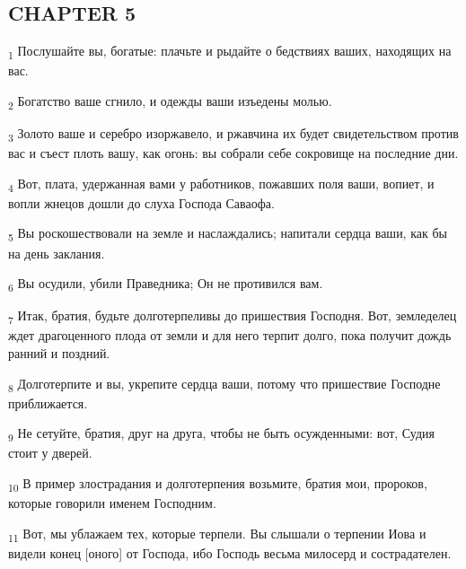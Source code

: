\subsection{CHAPTER 5}
\begin{tcolorbox}
\textsubscript{1} Послушайте вы, богатые: плачьте и рыдайте о бедствиях ваших, находящих на вас.
\end{tcolorbox}
\begin{tcolorbox}
\textsubscript{2} Богатство ваше сгнило, и одежды ваши изъедены молью.
\end{tcolorbox}
\begin{tcolorbox}
\textsubscript{3} Золото ваше и серебро изоржавело, и ржавчина их будет свидетельством против вас и съест плоть вашу, как огонь: вы собрали себе сокровище на последние дни.
\end{tcolorbox}
\begin{tcolorbox}
\textsubscript{4} Вот, плата, удержанная вами у работников, пожавших поля ваши, вопиет, и вопли жнецов дошли до слуха Господа Саваофа.
\end{tcolorbox}
\begin{tcolorbox}
\textsubscript{5} Вы роскошествовали на земле и наслаждались; напитали сердца ваши, как бы на день заклания.
\end{tcolorbox}
\begin{tcolorbox}
\textsubscript{6} Вы осудили, убили Праведника; Он не противился вам.
\end{tcolorbox}
\begin{tcolorbox}
\textsubscript{7} Итак, братия, будьте долготерпеливы до пришествия Господня. Вот, земледелец ждет драгоценного плода от земли и для него терпит долго, пока получит дождь ранний и поздний.
\end{tcolorbox}
\begin{tcolorbox}
\textsubscript{8} Долготерпите и вы, укрепите сердца ваши, потому что пришествие Господне приближается.
\end{tcolorbox}
\begin{tcolorbox}
\textsubscript{9} Не сетуйте, братия, друг на друга, чтобы не быть осужденными: вот, Судия стоит у дверей.
\end{tcolorbox}
\begin{tcolorbox}
\textsubscript{10} В пример злострадания и долготерпения возьмите, братия мои, пророков, которые говорили именем Господним.
\end{tcolorbox}
\begin{tcolorbox}
\textsubscript{11} Вот, мы ублажаем тех, которые терпели. Вы слышали о терпении Иова и видели конец [оного] от Господа, ибо Господь весьма милосерд и сострадателен.
\end{tcolorbox}
